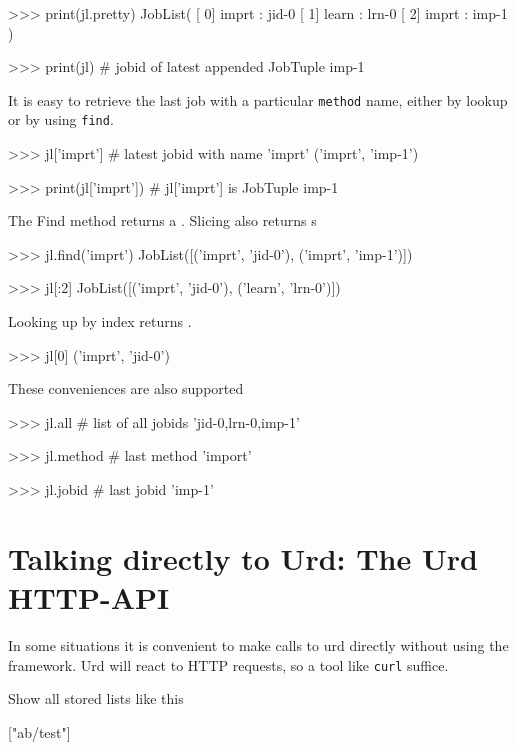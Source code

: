 \begin{python}
>>> print(jl.pretty)
JobList(
   [  0]  imprt : jid-0
   [  1]  learn : lrn-0
   [  2]  imprt : imp-1
)

>>>  print(jl)  # jobid of latest appended JobTuple
imp-1
\end{python}

It is easy to retrieve the last job with a particular \texttt{method}
name, either by lookup or by using \texttt{find}.

\begin{python}
>>> jl['imprt']         # latest jobid with name 'imprt'
('imprt', 'imp-1')

>>> print(jl['imprt'])   # jl['imprt'] is JobTuple
imp-1
\end{python}
The Find method returns a \joblist.  Slicing also returns {\joblist}s

\begin{python}
>>> jl.find('imprt')
JobList([('imprt', 'jid-0'), ('imprt', 'imp-1')])

>>> jl[:2]
JobList([('imprt', 'jid-0'), ('learn', 'lrn-0')])
\end{python}
Looking up by index returns \jobtuple.

\begin{python}
>>> jl[0]
('imprt', 'jid-0')
\end{python}
These conveniences are also supported

\begin{python}
>>> jl.all              # list of all jobids
'jid-0,lrn-0,imp-1'

>>> jl.method           # last method
'import'

>>> jl.jobid            # last jobid
'imp-1'
\end{python}



\newpage
\section{Talking directly to Urd:  The Urd HTTP-API}

In some situations it is convenient to make calls to urd directly
without using the framework.  Urd will react to HTTP requests, so a
tool like \texttt{curl} suffice.

\noindent Show all stored lists like this
\begin{shell}
["ab/test"]
\end{shell}

